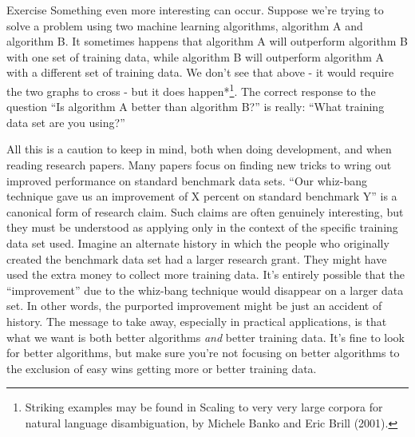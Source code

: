 \begin{exerciseBox}{Exercise}
Something even more interesting can occur. Suppose we're trying to solve a problem using two machine learning algorithms, algorithm A and algorithm B. It sometimes happens that algorithm A will outperform algorithm B with one set of training data, while algorithm B will outperform algorithm A with a different set of training data. We don't see that above - it would require the two graphs to cross - but it does happen*\footnote{Striking examples may be found in Scaling to very very large corpora for natural language disambiguation, by Michele Banko and Eric Brill (2001).}. The correct response to the question ``Is algorithm A better than algorithm B?'' is really: ``What training data set are you using?''


All this is a caution to keep in mind, both when doing development, and when reading research papers. Many papers focus on finding new tricks to wring out improved performance on standard benchmark data sets. ``Our whiz-bang technique gave us an improvement of X percent on standard benchmark Y'' is a canonical form of research claim. Such claims are often genuinely interesting, but they must be understood as applying only in the context of the specific training data set used. Imagine an alternate history in which the people who originally created the benchmark data set had a larger research grant. They might have used the extra money to collect more training data. It's entirely possible that the ``improvement'' due to the whiz-bang technique would disappear on a larger data set. In other words, the purported improvement might be just an accident of history. The message to take away, especially in practical applications, is that what we want is both better algorithms \emph{and} better training data. It's fine to look for better algorithms, but make sure you're not focusing on better algorithms to the exclusion of easy wins getting more or better training data.

\end{exerciseBox}



